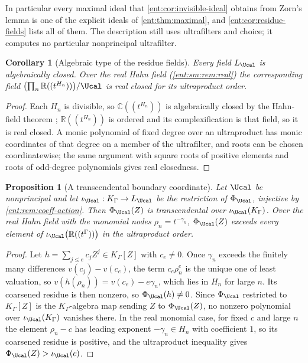 \documentclass[11pt]{article}
\theoremstyle{plain}
\theoremstyle{plain}
\newtheorem{proposition}[proposition]{Proposition}
\theoremstyle{plain}
\newtheorem{corollary}[corollary]{Corollary}
\theoremstyle{definition}
\theoremstyle{definition}
\theoremstyle{definition}
\theoremstyle{definition}
\theoremstyle{remark}
\newcommand{\C}{\mathbb C}\newcommand{\R}{\mathbb R}
\newcommand{\K}{K_\Gamma}\newcommand{\KD}{K_\Delta}
\begin{document}
In particular every maximal ideal that \cref{ent:cor:invisible-ideal}
obtains from Zorn's lemma is one of the explicit ideals of
\cref{ent:thm:maximal}, and \cref{ent:cor:residue-fields} lists all of them.
The description still uses ultrafilters and choice; it computes no
particular nonprincipal ultrafilter.

\begin{corollary}[Algebraic type of the residue fields]
\label{ent:sm:cor:boundary-fields}
Every field $L_\Ucal$ is algebraically closed. Over the real Hahn field
(\cref{ent:sm:rem:real}) the corresponding field
$\bigl(\prod_n\R((t^{H_n}))\bigr)/\Ucal$ is real closed for its ultraproduct
order.
\end{corollary}
\begin{proof}
Each $H_n$ is divisible, so $\C((t^{H_n}))$ is algebraically closed by the
Hahn-field theorem \cite[Corollary~4]{Poonen}; $\R((t^{H_n}))$ is ordered and
its complexification is that field, so it is real closed. A monic polynomial
of fixed degree over an ultraproduct has monic coordinates of that degree on
a member of the ultrafilter, and roots can be chosen coordinatewise; the same
argument with square roots of positive elements and roots of odd-degree
polynomials gives real closedness.
\end{proof}

\begin{proposition}[A transcendental boundary coordinate]
\label{ent:sm:prop:transcendental}
Let $\Ucal$ be nonprincipal and let $\iota_\Ucal:\K\to L_\Ucal$ be the
restriction of $\Phi_\Ucal$, injective by \cref{ent:rem:coeff-action}. Then
$\Phi_\Ucal(Z)$ is transcendental over $\iota_\Ucal(\K)$. Over the real Hahn
field with the monomial nodes $\rho_n=t^{-\gamma_n}$, $\Phi_\Ucal(Z)$ exceeds
every element of $\iota_\Ucal\bigl(\R((t^\Gamma))\bigr)$ in the ultraproduct
order.
\end{proposition}
\begin{proof}
Let $h=\sum_{j\le e}c_jZ^j\in\K[Z]$ with $c_e\ne0$. Once $\gamma_n$ exceeds
the finitely many differences $v(c_j)-v(c_e)$, the term $c_e\rho_n^e$ is the
unique one of least valuation, so $v(h(\rho_n))=v(c_e)-e\gamma_n$, which lies
in $H_n$ for large $n$. Its coarsened residue is then nonzero, so
$\Phi_\Ucal(h)\ne0$. Since $\Phi_\Ucal$ restricted to $\K[Z]$ is the
$\K$-algebra map sending $Z$ to $\Phi_\Ucal(Z)$, no nonzero polynomial over
$\iota_\Ucal(\K)$ vanishes there. In the real monomial case, for fixed $c$
and large $n$ the element $\rho_n-c$ has leading exponent $-\gamma_n\in H_n$
with coefficient $1$, so its coarsened residue is positive, and the
ultraproduct inequality gives $\Phi_\Ucal(Z)>\iota_\Ucal(c)$.
\end{proof}
\end{document}
